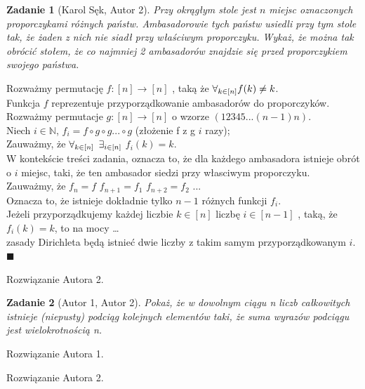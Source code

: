 \documentclass{mwart}
\newcommand{\N}{\mathbb{N}}
\newtheorem{zad}{Zadanie}[section]
\begin{document}
\begin{zad}[Karol Sęk, Autor 2]
    Przy okrągłym stole jest $n$ miejsc oznaczonych proporczykami różnych
    państw. Ambasadorowie tych państw usiedli przy tym stole tak, że żaden z nich nie siadł
    przy właściwym proporczyku. Wykaż, że można tak obrócić stołem, że co najmniej 2
    ambasadorów znajdzie się przed proporczykiem swojego państwa.
\end{zad}
\begin{mdframed}
    Rozważmy permutację $f:[n] \rightarrow [n]$ , taką że $\forall_{\small k\in[n]} f(k) \ne k$.\\
    Funkcja $f$ reprezentuje przyporządkowanie ambasadorów do proporczyków.\\
    Rozważmy permutacje $g:[n] \rightarrow [n]$ o wzorze $(12345...(n-1)n)$.\\
    Niech $i \in \N$, $f_i = f \circ g \circ g ... \circ g$ (złożenie f z g $i$ razy);\\
    Zauważmy, że $\forall_{\small k\in[n]}$ $\exists_{\small i\in[n]}$ $ f_i(k) = k$.\\
    W kontekście treści zadania, oznacza to, że dla każdego ambasadora istnieje obrót o $i$ miejsc, taki, że
    ten ambasador siedzi przy własciwym proporczyku. \\
    Zauważmy, że $f_n = f$ $f_{n+1} = f_1$ $f_{n+2} = f_2$ ...\\
    Oznacza to, że istnieje dokładnie tylko $n-1$ różnych funkcji $f_i$.\\
    Jeżeli przyporządkujemy każdej liczbie $k \in [n]$  liczbę $i \in [n-1]$ , taką, że $f_i(k) =k$, to na mocy \dots\\
    zasady Dirichleta będą istnieć dwie liczby z takim samym przyporządkowanym $i$.\\
     $\blacksquare$
\end{mdframed}
\begin{mdframed}
    Rozwiązanie Autora 2.
\end{mdframed}




\begin{zad}[Autor 1, Autor 2]
    Pokaż, że w dowolnym ciągu n liczb całkowitych istnieje (niepusty)
    podciąg kolejnych elementów taki, że suma wyrazów podciągu jest wielokrotnością n.
\end{zad}
\begin{mdframed}
    Rozwiązanie Autora 1.
\end{mdframed}
\begin{mdframed}
    Rozwiązanie Autora 2.
\end{mdframed}
\end{document}
